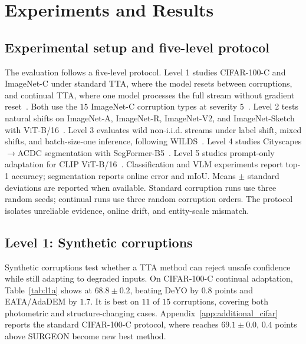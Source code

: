 
\section{Experiments and Results}

\subsection{Experimental setup and five-level protocol}

The evaluation follows a five-level protocol. Level 1 studies CIFAR-100-C and ImageNet-C under standard TTA, where the model resets between corruptions, and continual TTA, where one model processes the full stream without gradient reset~\citep{wang2021tent,wang2022cotta}. Both use the $15$ ImageNet-C corruption types at severity $5$~\citep{hendrycks2019imagenetc}. Level 2 tests natural shifts on ImageNet-A, ImageNet-R, ImageNet-V2, and ImageNet-Sketch with ViT-B/16~\citep{dosovitskiy2021vit,hendrycks2021imageneta,hendrycks2021manyfaces,recht2021imagenetv2}. Level 3 evaluates wild non-i.i.d. streams under label shift, mixed shifts, and batch-size-one inference, following WILDS~\citep{koh2021wilds}. Level 4 studies Cityscapes$\rightarrow$ACDC segmentation with SegFormer-B5~\citep{cordts2016cityscapes,sakaridis2021acdc,xie2021segformer}. Level 5 studies prompt-only adaptation for CLIP ViT-B/16~\citep{radford2021clip}. Classification and VLM experiments report top-1 accuracy; segmentation reports online error and mIoU. Means $\pm$ standard deviations are reported when available. Standard corruption runs use three random seeds; continual runs use three random corruption orders. The protocol isolates unreliable evidence, online drift, and entity-scale mismatch.

\subsection{Level 1: Synthetic corruptions}



Synthetic corruptions test whether a TTA method can reject unsafe confidence while still adapting to degraded inputs. On CIFAR-100-C continual adaptation, Table~\ref{tab:l1a} shows \method{} at $68.8\pm0.2$, beating DeYO by $0.8$ points and EATA/AdaDEM by $1.7$. It is best on $11$ of $15$ corruptions, covering both photometric and structure-changing cases. Appendix~\ref{app:additional_cifar} reports the standard CIFAR-100-C protocol, where \method{} reaches $69.1\pm0.0$, $0.4$ points above SURGEON become new best method.

